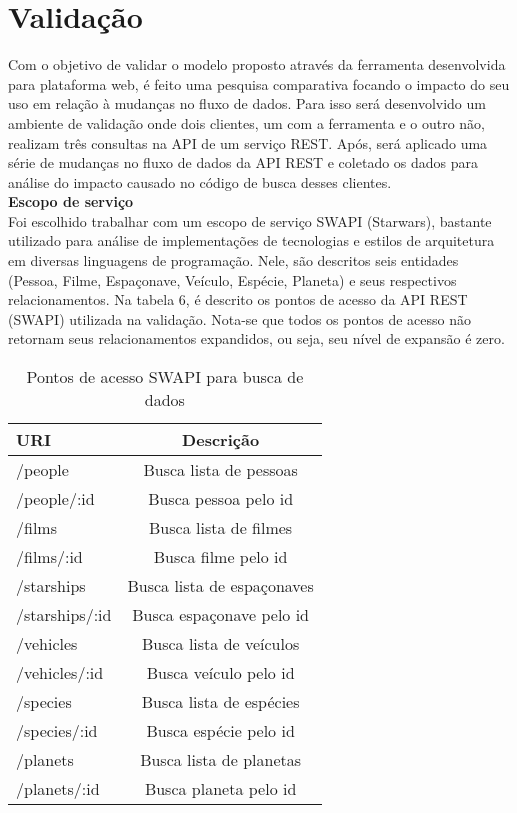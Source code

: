 \section{Validação}

Com o objetivo de validar o modelo proposto através da ferramenta desenvolvida para plataforma web, é feito uma pesquisa comparativa focando o impacto do seu uso em relação à mudanças no fluxo de dados. Para isso será desenvolvido um ambiente de validação onde dois clientes, um com a ferramenta e o outro não, realizam três consultas na API de um serviço REST. Após, será aplicado uma série de mudanças no fluxo de dados da API REST e coletado os dados para análise do impacto causado no código de busca desses clientes. \\

\textbf{Escopo de serviço} \\

Foi escolhido trabalhar com um escopo de serviço SWAPI (Starwars), bastante utilizado para análise de implementações de tecnologias e estilos de arquitetura em diversas linguagens de programação. Nele, são descritos seis entidades (Pessoa, Filme, Espaçonave, Veículo, Espécie, Planeta) e seus respectivos relacionamentos. Na tabela 6, é descrito os pontos de acesso da API REST (SWAPI) utilizada na validação. Nota-se que todos os pontos de acesso não retornam seus relacionamentos expandidos, ou seja, seu nível de expansão é zero.

\begin{table}[H]
  \centering
  \begin{tabular}{|l|c|}
    \hline
    URI & Descrição \\
    \hline
    /people & Busca lista de pessoas \\
    \hline
    /people/:id & Busca pessoa pelo id \\
    \hline
    /films & Busca lista de filmes \\
    \hline
    /films/:id & Busca filme pelo id \\
    \hline
    /starships & Busca lista de espaçonaves \\
    \hline
    /starships/:id & Busca espaçonave pelo id \\
    \hline
    /vehicles & Busca lista de veículos \\
    \hline
    /vehicles/:id & Busca veículo pelo id \\
    \hline
    /species & Busca lista de espécies \\
    \hline
    /species/:id & Busca espécie pelo id \\
    \hline
    /planets & Busca lista de planetas \\
    \hline
    /planets/:id & Busca planeta pelo id \\
    \hline
  \end{tabular}
  \caption{Pontos de acesso SWAPI para busca de dados}
\end{table}

